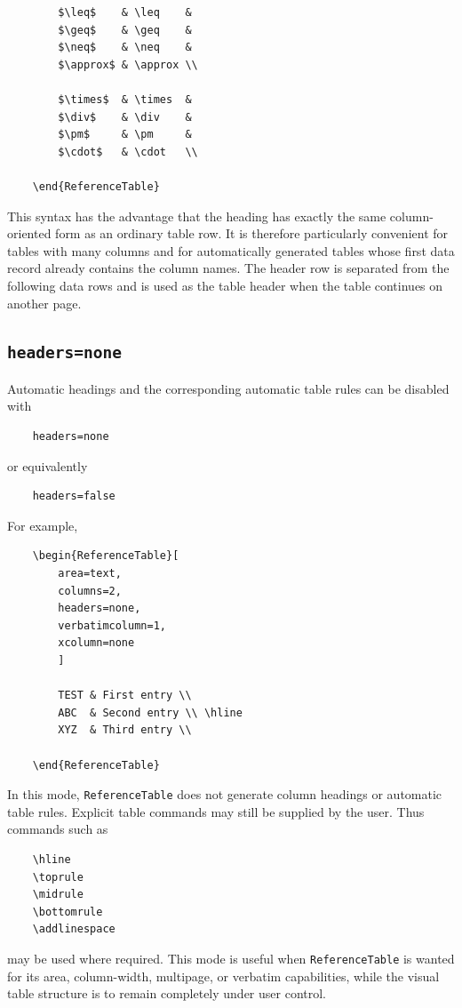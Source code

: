 \documentclass[
11pt,
a4paper,
oneside
]{scrbook}
\begin{document}
{\begin{verbatim}
		$\leq$    & \leq    &
		$\geq$    & \geq    &
		$\neq$    & \neq    &
		$\approx$ & \approx \\
		
		$\times$  & \times  &
		$\div$    & \div    &
		$\pm$     & \pm     &
		$\cdot$   & \cdot   \\
		
	\end{ReferenceTable}
\end{verbatim}
This syntax has the advantage that the heading has exactly the same
column-oriented form as an ordinary table row. It is therefore particularly
convenient for tables with many columns and for automatically generated
tables whose first data record already contains the column names.
The header row is separated from the following data rows and is used as the
table header when the table continues on another page.

\subsection{\texttt{headers=none}}

Automatic headings and the corresponding automatic table rules can be
disabled with
\begin{verbatim}
	headers=none
\end{verbatim}
or equivalently
\begin{verbatim}
	headers=false
\end{verbatim}
For example,
\begin{verbatim}
	\begin{ReferenceTable}[
		area=text,
		columns=2,
		headers=none,
		verbatimcolumn=1,
		xcolumn=none
		]
		
		TEST & First entry \\
		ABC  & Second entry \\ \hline
		XYZ  & Third entry \\
		
	\end{ReferenceTable}
\end{verbatim}
In this mode, \texttt{ReferenceTable} does not generate column headings or
automatic table rules. Explicit table commands may still be supplied by the
user. Thus commands such as
\begin{verbatim}
	\hline
	\toprule
	\midrule
	\bottomrule
	\addlinespace
\end{verbatim}
may be used where required.
This mode is useful when \texttt{ReferenceTable} is wanted for its area,
column-width, multipage, or verbatim capabilities, while the visual table
structure is to remain completely under user control.

}
\end{document}
